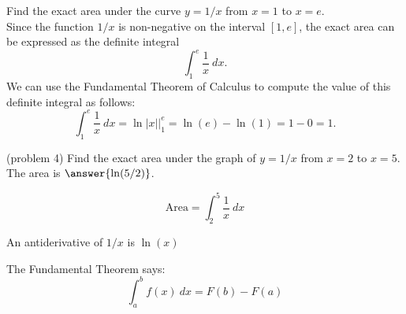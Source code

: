 \documentclass[handout]{ximera}
\begin{document}
\begin{example}[example 4]
Find the exact area under the curve $y = 1/x$ from $x=1$ to $x= e$.\\
Since the function $1/x$ is non-negative on the interval $[1, e]$, the exact area can be expressed as the definite integral
\[\int_1^{e} \frac{1}{x} \ dx.\]
We can use the Fundamental Theorem of Calculus to compute the value of this definite integral as follows:
\[
\int_1^e \frac{1}{x} \ dx = \ln|x| \Big|_1^e = \ln(e) - \ln(1)= 1- 0 = 1.
\]


\begin{image}
\end{image}

\end{example}



\begin{problem}(problem 4)
Find the exact area under the graph of $y = 1/x$ from $x = 2$ to $x = 5$.\\
The area is $\answer{\ln(5/2)}$.
 \begin{hint}
  \[
  \text{Area} = \int_2^{5} \frac{1}{x} \ dx
  \]
  \end{hint}
    \begin{hint}
      An antiderivative of $1/x$ is $\ln(x)$
    \end{hint}
    \begin{hint}
      The Fundamental Theorem says:
      \[
      \int_a^b f(x) \ dx = F(b) - F(a)
      \]
    \end{hint}    
		
		
\end{problem}
\end{document}

